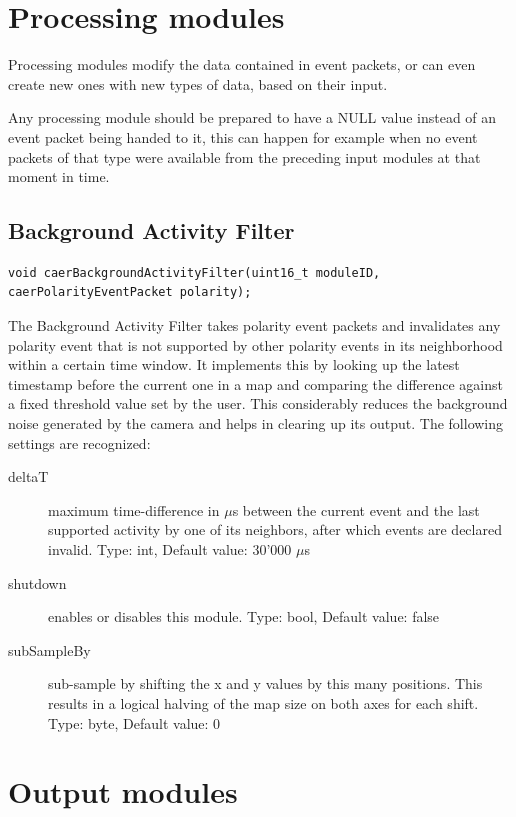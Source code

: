 \documentclass[a4paper,12pt]{report}
\begin{document}
\section{Processing modules} \label{sec:processing_modules}

Processing modules modify the data contained in event packets, or can even create new ones with new types of data, based on their input.

Any processing module should be prepared to have a NULL value instead of an event packet being handed to it, this can happen for example when no event packets of that type were available from the preceding input modules at that moment in time.

\subsection{Background Activity Filter} \label{subsec:backgroundactivityfilter}

\begin{lstlisting}
void caerBackgroundActivityFilter(uint16_t moduleID, caerPolarityEventPacket polarity);
\end{lstlisting}

The Background Activity Filter takes polarity event packets and invalidates any polarity event that is not supported by other polarity events in its neighborhood within a certain time window.
It implements this by looking up the latest timestamp before the current one in a map and comparing the difference against a fixed threshold value set by the user.
This considerably reduces the background noise generated by the camera and helps in clearing up its output.
\clearpage
The following settings are recognized:
\begin{description}
\item[deltaT] maximum time-difference in $\mu$s between the current event and the last supported activity by one of its neighbors, after which events are declared invalid.
\subitem Type: int, Default value: 30'000 $\mu$s
\item[shutdown] enables or disables this module.
\subitem Type: bool, Default value: false
\item[subSampleBy] sub-sample by shifting the x and y values by this many positions. This results in a logical halving of the map size on both axes for each shift.
\subitem Type: byte, Default value: 0
\end{description}

\section{Output modules} \label{sec:output_modules}
\end{document}
